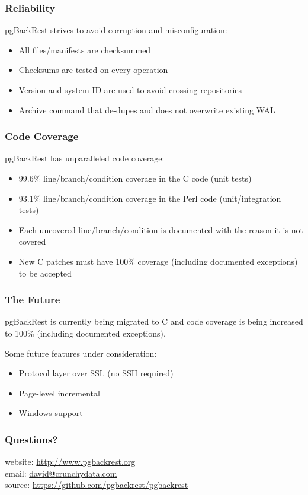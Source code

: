 \begin{frame}
    \frametitle{Reliability}

    pgBackRest strives to avoid corruption and misconfiguration:

    \begin{itemize}
        \item All files/manifests are checksummed
        \item Checksums are tested on every operation
        \item Version and system ID are used to avoid crossing repositories
        \item Archive command that de-dupes and does not overwrite existing WAL
    \end{itemize}
\end{frame}

\begin{frame}
    \frametitle{Code Coverage}

    pgBackRest has unparalleled code coverage:

    \begin{itemize}
        \item 99.6\% line/branch/condition coverage in the C code (unit tests)
        \item 93.1\% line/branch/condition coverage in the Perl code (unit/integration tests)
        \item Each uncovered line/branch/condition is documented with the reason it is not covered
        \item New C patches must have 100\% coverage (including documented exceptions) to be accepted
    \end{itemize}
\end{frame}

\begin{frame}
    \frametitle{The Future}

    pgBackRest is currently being migrated to C and code coverage is being increased to 100\% (including documented exceptions).\vspace{1em}

    Some future features under consideration:

    \begin{itemize}
        \item Protocol layer over SSL (no SSH required)
        \item Page-level incremental
        \item Windows support
    \end{itemize}
\end{frame}

\begin{frame}
    \frametitle{Questions?}

    website: \url{http://www.pgbackrest.org}\\
    \vspace{1em}
    email: \href{mailto:david@crunchydata.com}{david@crunchydata.com}\\
    \vspace{1em}
    source: \url{https://github.com/pgbackrest/pgbackrest}
\end{frame}


